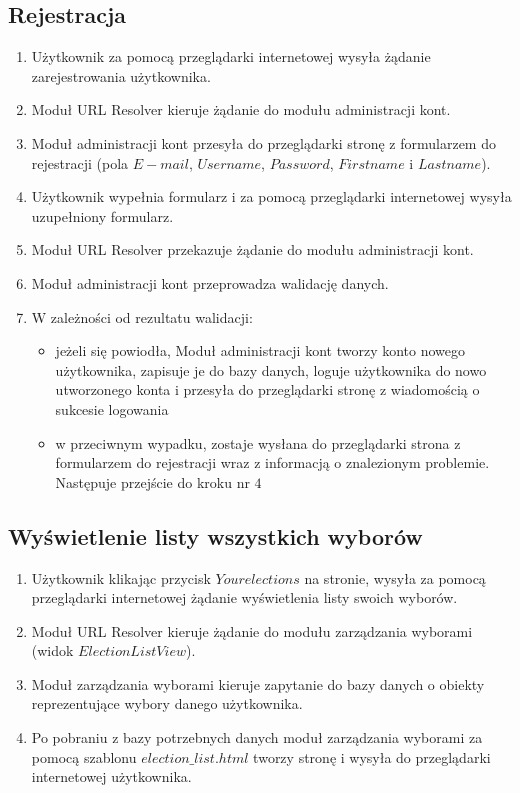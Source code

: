 \documentclass[pdflatex,11pt]{../aghdoc_version2}
\begin{document}
\subsection{Rejestracja}
\begin{enumerate}
\item Użytkownik za pomocą przeglądarki internetowej wysyła żądanie zarejestrowania
użytkownika.
\item Moduł URL Resolver kieruje żądanie do modułu administracji kont.
\item Moduł administracji kont przesyła do przeglądarki stronę z formularzem do rejestracji
(pola $E-mail$, $Username$, $Password$, $First name$ i $Last name$).
\item Użytkownik wypełnia formularz i za pomocą przeglądarki internetowej wysyła
uzupełniony formularz.
\item Moduł URL Resolver przekazuje żądanie do modułu administracji kont.
\item Moduł administracji kont przeprowadza walidację danych.
\item W zależności od rezultatu walidacji:
	\begin{itemize}
	\item jeżeli się powiodła, Moduł administracji kont tworzy konto nowego użytkownika, 			zapisuje je do
	bazy danych, loguje użytkownika do nowo utworzonego konta i przesyła do
	przeglądarki stronę z wiadomością o sukcesie logowania
	\item w przeciwnym wypadku, zostaje wysłana do przeglądarki strona z
	formularzem do rejestracji wraz z informacją o znalezionym problemie.
	Następuje przejście do kroku nr $4$
	\end{itemize}
\end{enumerate}

\subsection{Wyświetlenie listy wszystkich wyborów}
\begin{enumerate}
\item Użytkownik klikając przycisk $Your elections$ na stronie, wysyła za pomocą
przeglądarki internetowej żądanie wyświetlenia listy swoich wyborów.
\item Moduł URL Resolver kieruje żądanie do modułu zarządzania wyborami (widok
$ElectionListView$).
\item Moduł zarządzania wyborami kieruje zapytanie do bazy danych o obiekty
reprezentujące wybory danego użytkownika.
\item Po pobraniu z bazy potrzebnych danych moduł zarządzania wyborami za pomocą
szablonu $election\_list.html$ tworzy stronę i wysyła do przeglądarki internetowej
użytkownika.
\end{enumerate}
\end{document}
